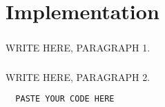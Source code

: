 \chapter{Implementation}
\paragraph{}WRITE HERE, PARAGRAPH 1.
\paragraph{}WRITE HERE, PARAGRAPH 2.


\begin{lstlisting}
  PASTE YOUR CODE HERE
\end{lstlisting}
\newpage

